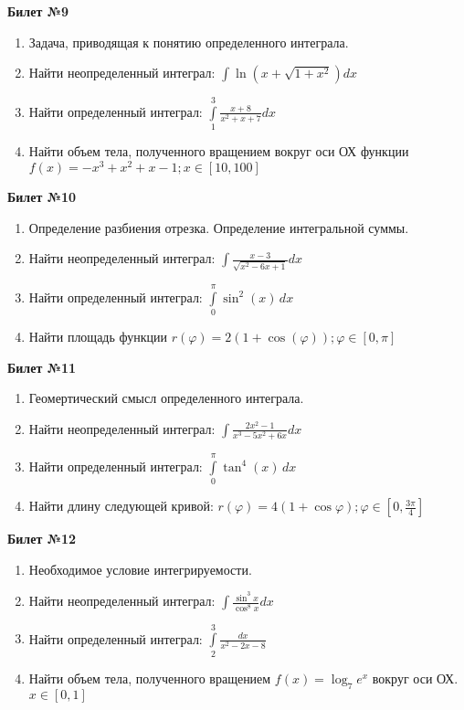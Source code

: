 \documentclass[a4paper, 12pt]{article}
\begin{document}
\begin{center}
	\textbf{Билет №9}
\end{center}
\begin{enumerate}
	\item Задача, приводящая к понятию определенного интеграла.
	\item Найти неопределенный интеграл: $\displaystyle \int{\ln (x + \sqrt{1 + x^2}) dx}$
	\item Найти определенный интеграл: $\displaystyle \int\limits_{1}^{3}{\frac{x+8}{x^2+x+7}dx}$
	\item Найти объем тела, полученного вращением вокруг оси ОХ функции $\displaystyle f(x) = - x ^ {3} + x^2 + x -1; x \in \left[10,100\right]$
\end{enumerate}

\begin{center}
	\textbf{Билет №10}
\end{center}
\begin{enumerate}
	\item Определение разбиения отрезка. Определение интегральной суммы.
	\item Найти неопределенный интеграл: $\displaystyle \int{\frac{x - 3}{\sqrt{x^2 - 6x + 1}} dx}$
	\item Найти определенный интеграл: $\displaystyle \int\limits_{0}^{\pi} \sin^2(x)\,dx$
	\item Найти площадь функции $\displaystyle r(\varphi) = 2(1+\cos(\varphi)); \varphi \in \left[0,\pi\right]$
\end{enumerate}

\begin{center}
	\textbf{Билет №11}
\end{center}
\begin{enumerate}
	\item Геомертический смысл определенного интеграла.
	\item Найти неопределенный интеграл: $\displaystyle \int{\frac{2x^2 - 1}{x^3 - 5x^2 +6x} dx}$
	\item Найти определенный интеграл: $\displaystyle \int\limits_{0}^{\pi} \tan^4(x)\,dx$
	\item Найти длину следующей кривой: $\displaystyle r(\varphi) = 4(1+\cos{\varphi}); \varphi \in \left[0, \frac{3\pi}{4}\right]$
\end{enumerate}

\begin{center}
	\textbf{Билет №12}
\end{center}
\begin{enumerate}
	\item Необходимое условие интегрируемости.
	\item Найти неопределенный интеграл: $\displaystyle \int{\frac{\sin^3 x}{\cos^8 x} dx}$
	\item Найти определенный интеграл: $\displaystyle \int\limits_{2}^{3} \frac{dx}{x^2 - 2x - 8}$
	\item Найти объем тела, полученного вращением $\displaystyle f(x)=\log_{7}{e^x}$ вокруг оси ОХ. $x \in \left[0,1\right]$
\end{enumerate}
\end{document}

